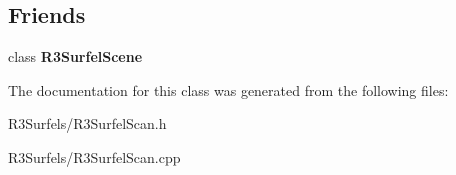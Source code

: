 \subsection*{Friends}
\begin{DoxyCompactItemize}
\item 
class {\bfseries R3\+Surfel\+Scene}\hypertarget{class_r3_surfel_scan_af9bb32c0eac7d1d54787bbc6b44586b6}{}\label{class_r3_surfel_scan_af9bb32c0eac7d1d54787bbc6b44586b6}

\end{DoxyCompactItemize}


The documentation for this class was generated from the following files\+:\begin{DoxyCompactItemize}
\item 
R3\+Surfels/R3\+Surfel\+Scan.\+h\item 
R3\+Surfels/R3\+Surfel\+Scan.\+cpp\end{DoxyCompactItemize}
